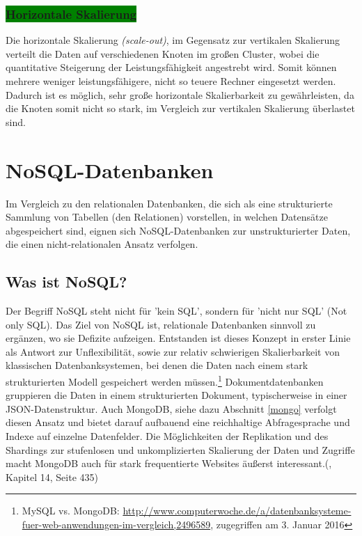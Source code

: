 \subsubsection{\colorbox{green}{Horizontale Skalierung}}

Die horizontale Skalierung \textit{(scale-out)}, im Gegensatz zur vertikalen Skalierung verteilt die Daten auf verschiedenen Knoten im großen Cluster, wobei die quantitative Steigerung der Leistungsfähigkeit angestrebt wird. Somit können mehrere weniger leistungsfähigere, nicht so teuere Rechner eingesetzt werden. Dadurch ist es möglich, sehr große horizontale Skalierbarkeit zu gewährleisten, da die Knoten somit nicht so stark, im Vergleich zur vertikalen Skalierung überlastet sind. 

\section{NoSQL-Datenbanken}
Im Vergleich zu den relationalen Datenbanken, die sich als eine strukturierte Sammlung von Tabellen (den Relationen) vorstellen, in welchen Datensätze abgespeichert sind, eignen sich NoSQL-Datenbanken zur unstrukturierter Daten, die einen nicht-relationalen Ansatz verfolgen. 


\subsection{Was ist NoSQL?}
Der Begriff NoSQL steht nicht für 'kein SQL', sondern für 'nicht nur SQL' (Not only SQL). Das Ziel von NoSQL ist, relationale Datenbanken sinnvoll zu ergänzen, wo sie Defizite aufzeigen. Entstanden ist dieses Konzept in erster Linie als Antwort zur Unflexibilität, sowie zur relativ schwierigen Skalierbarkeit von klassischen Datenbanksystemen, bei denen die Daten nach einem stark strukturierten Modell gespeichert werden müssen.\footnote{MySQL vs. MongoDB: \url{http://www.computerwoche.de/a/datenbanksysteme-fuer-web-anwendungen-im-vergleich,2496589}, zugegriffen am 3. Januar 2016} Dokumentdatenbanken gruppieren die Daten in einem strukturierten Dokument, typischerweise in einer JSON-Datenstruktur. Auch MongoDB, siehe dazu Abschnitt \ref{mongo} verfolgt diesen Ansatz und bietet darauf aufbauend eine reichhaltige Abfragesprache und Indexe auf einzelne Datenfelder. Die Möglichkeiten der Replikation und des Shardings zur stufenlosen und unkomplizierten Skalierung der Daten und Zugriffe macht MongoDB auch für stark frequentierte Websites äußerst interessant.(\cite{Hollosi.2012}, Kapitel 14, Seite 435)

